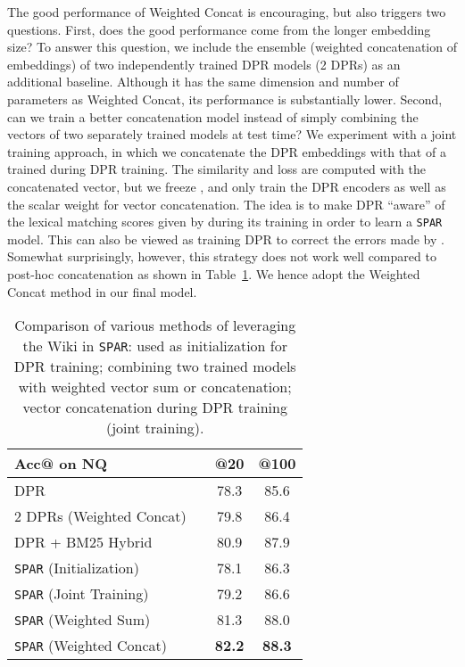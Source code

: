\documentclass[11pt]{article}
\newcommand{\spar}{\texttt{SPAR}\xspace}
\newcommand{\lexmodelsymbol}{\xspace}
\begin{document}
The good performance of Weighted Concat is encouraging, but also triggers two questions. 
First, does the good performance come from the longer embedding size? 
To answer this question, we include the ensemble (weighted concatenation of embeddings) of two independently trained DPR models (2 DPRs) as an additional baseline.
Although it has the same dimension and number of parameters as Weighted Concat, its performance is substantially lower.
Second, can we train a better concatenation model instead of simply combining the vectors of two separately trained models at test time?
We experiment with a joint training approach, in which we concatenate the DPR embeddings with that of a trained \lexmodelsymbol{} during DPR training.
The similarity and loss are computed with the concatenated vector, but we freeze \lexmodelsymbol{}, and only train the DPR encoders as well as the scalar weight for vector concatenation.
The idea is to make DPR ``aware'' of the lexical matching scores given by \lexmodelsymbol{} during its training in order to learn a \spar{} model.
This can also be viewed as training DPR to correct the errors made by \lexmodelsymbol{}.
Somewhat surprisingly, however, this strategy does not work well compared to post-hoc concatenation as shown in Table~\ref{tab:lexical_model_use}.
We hence adopt the Weighted Concat method in our final model.

\begin{table}[t]
    \centering
    \small
    \begin{tabular}{l c cc}
    \toprule
    Acc@ on NQ && @20 & @100 \\
    \midrule
    DPR     && 78.3 & 85.6 \\
    2 DPRs (Weighted Concat)             && 79.8 & 86.4 \\
    DPR + BM25 Hybrid                  && 80.9 & 87.9 \\
    \midrule
    \spar{} (Initialization)     && 78.1 & 86.3 \\
    \spar{} (Joint Training)     && 79.2 & 86.6 \\
    \spar{} (Weighted Sum)        && 81.3 & 88.0 \\
    \spar{} (Weighted Concat)        && \bf 82.2 & \bf 88.3 \\
    \bottomrule
    \end{tabular}
    \caption{Comparison of various methods of leveraging the Wiki \lexmodelsymbol{} in \spar{}: used as initialization for DPR training; combining two trained models with weighted vector sum or concatenation; vector concatenation during DPR training (joint training).}
    \label{tab:lexical_model_use}
\end{table} 
\end{document}
